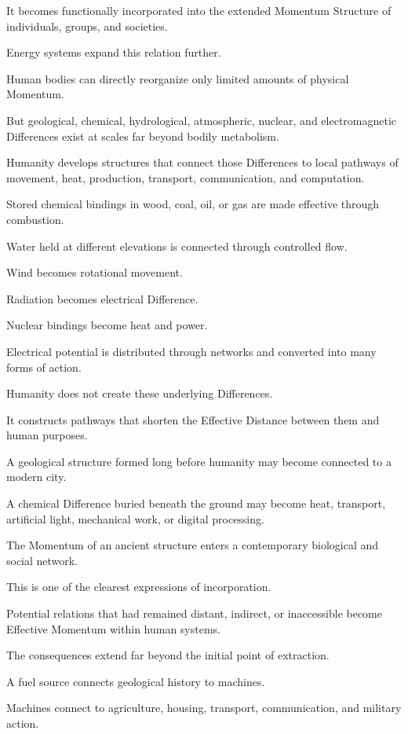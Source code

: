 It becomes functionally incorporated into the extended Momentum Structure of individuals, groups, and societies.

Energy systems expand this relation further.

Human bodies can directly reorganize only limited amounts of physical Momentum.

But geological, chemical, hydrological, atmospheric, nuclear, and electromagnetic Differences exist at scales far beyond bodily metabolism.

Humanity develops structures that connect those Differences to local pathways of movement, heat, production, transport, communication, and computation.

Stored chemical bindings in wood, coal, oil, or gas are made effective through combustion.

Water held at different elevations is connected through controlled flow.

Wind becomes rotational movement.

Radiation becomes electrical Difference.

Nuclear bindings become heat and power.

Electrical potential is distributed through networks and converted into many forms of action.

Humanity does not create these underlying Differences.

It constructs pathways that shorten the Effective Distance between them and human purposes.

A geological structure formed long before humanity may become connected to a modern city.

A chemical Difference buried beneath the ground may become heat, transport, artificial light, mechanical work, or digital processing.

The Momentum of an ancient structure enters a contemporary biological and social network.

This is one of the clearest expressions of incorporation.

Potential relations that had remained distant, indirect, or inaccessible become Effective Momentum within human systems.

The consequences extend far beyond the initial point of extraction.

A fuel source connects geological history to machines.

Machines connect to agriculture, housing, transport, communication, and military action.

